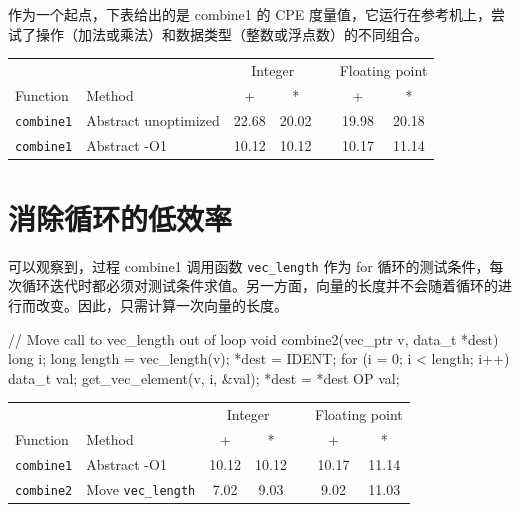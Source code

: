 作为一个起点，下表给出的是 combine1 的 CPE 度量值，它运行在参考机上，尝试了操作（加法或乘法）和数据类型（整数或浮点数）的不同组合。

\begin{table}[!ht]
    \centering
    \begin{tabular}{llccccc}
        \toprule
        & & \multicolumn{2}{c}{Integer} & & \multicolumn{2}{c}{Floating point} \\
        \cmidrule{3-4} \cmidrule{6-7}
        Function & Method & + & * & & + & * \\
        \midrule
        \texttt{combine1} & Abstract unoptimized & 22.68 & 20.02 & & 19.98 & 20.18 \\
        \texttt{combine1} & Abstract -O1 & 10.12 & 10.12 & & 10.17 & 11.14 \\
        \bottomrule
    \end{tabular}
\end{table}

\section{消除循环的低效率}

可以观察到，过程 combine1 调用函数 \verb|vec_length| 作为 for 循环的测试条件，每次循环迭代时都必须对测试条件求值。另一方面，向量的长度并不会随着循环的进行而改变。因此，只需计算一次向量的长度。

\begin{cppcode}
// Move call to vec_length out of loop
void combine2(vec_ptr v, data_t *dest) {
  long i;
  long length = vec_length(v);
  *dest = IDENT;
  for (i = 0; i < length; i++) {
    data_t val;
    get_vec_element(v, i, &val);
    *dest = *dest OP val;
  }
}
\end{cppcode}

\begin{table}[!ht]
    \centering
    \begin{tabular}{llccccc}
        \toprule
        & & \multicolumn{2}{c}{Integer} & & \multicolumn{2}{c}{Floating point} \\
        \cmidrule{3-4} \cmidrule{6-7}
        Function & Method & + & * & & + & * \\
        \midrule
        \texttt{combine1} & Abstract -O1 & 10.12 & 10.12 & & 10.17 & 11.14 \\
        \texttt{combine2} & Move \texttt{vec\_length} & 7.02 & 9.03 & & 9.02 & 11.03 \\
        \bottomrule
    \end{tabular}
\end{table}

